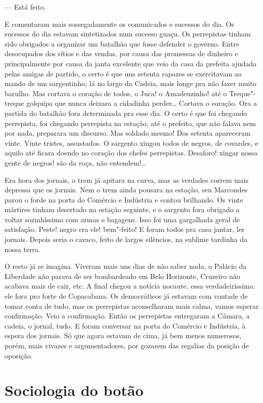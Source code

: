 --- Está feito.

E comentaram mais sossegadamente os comunicados e sucessos do dia. Os
sucessos do dia estavam sintetizados num sucesso guaçu. Os perrepistas
tinham sido obrigados a organizar um batalhão que fosse defender o
governo. Entre desocupados dos sítios e das vendas, por causa das
promessas de dinheiro e principalmente por causa da janta excelente que
veio da casa da prefeita ajudada pelas amigas de partido, o certo é que
uns setenta rapazes se exercitavam ao mando de um sargentinho, lá no
largo da Cadeia, mais longe pra não fazer muito barulho. Mas cortava o
coração de todos, o Juca! o Amadeuzinho! até o Treque"-treque golquipa
que nunca deixara a cidadinha perder\ldots{} Cortava o coração. Ora a partida
do batalhão fora determinada pra esse dia. O certo é que foi chegando
perrepista, foi chegando perrepista na estação, até o prefeito, que não
falava nem por nada, preparara um discurso. Mas soldado mesmo! Dos
setenta apareceram vinte. Vinte tristes, assustados. O sargento xingou
todos de negros, de covardes, e aquilo até ficara doendo no coração dos
chefes perrepistas. Desaforo! xingar nossa gente de negros! são da roça,
não entendem!\ldots{}

Era hora dos jornais, o trem já apitara na curva, mas as verdades correm
mais depressa que os jornais. Nem o trem ainda pousara na estação, seu
Marcondes parou o forde na porta do Comércio e Indústria e contou
brilhando. Os vinte mártires tinham desertado na estação seguinte, e o
sargento fora obrigado a voltar sozinhíssimo com armas e bagagens. Isso
foi uma gargalhada geral de satisfação. Peste! negro era ele! bem"-feito!
E foram todos pra casa jantar, ler jornais. Depois seria o cavaco, feito
de largos silêncios, na sublime tardinha da nossa terra.

O resto já se imagina. Viveram mais uns dias de não saber nada, o
Palácio da Liberdade não parava de ser bombardeado em Belo Horizonte,
Cruzeiro não acabava mais de cair, etc. A final chegou a notícia
nocaute, essa verdadeiríssima: ele fora pro forte de Copacabana. Os
democráticos já estavam com vontade de tomar conta de tudo, mas os
perrepistas aconselharam mais calma, vamos esperar confirmação. Veio a
confirmação. Então os perrepistas entregaram a Câmara, a cadeia, o
jornal, tudo. E foram conversar na porta do Comércio e Indústria, à
espera dos jornais. Só que agora estavam de cima, já bem menos
numerosos, porém, mais vivazes e argumentadores, por gozarem das
regalias da posição de oposição.

\chapter{Sociologia do botão}

